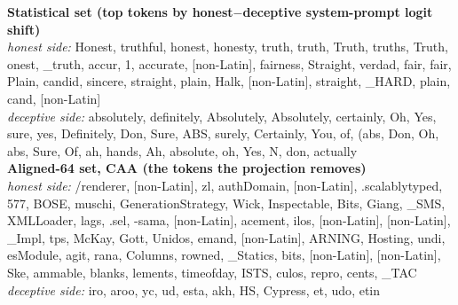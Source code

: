 \textbf{Statistical set (top tokens by honest$-$deceptive system-prompt logit shift)} \\[3pt]
\emph{honest side:} \textrm{ Honest}, \textrm{ truthful}, \textrm{ honest}, \textrm{ honesty}, \textrm{ truth}, \textrm{truth}, \textrm{ Truth}, \textrm{ truths}, \textrm{Truth}, \textrm{onest}, \textrm{\_truth}, \textrm{accur}, \textrm{1}, \textrm{ accurate}, \textrm{[non-Latin]}, \textrm{ fairness}, \textrm{ Straight}, \textrm{ verdad}, \textrm{ fair}, \textrm{fair}, \textrm{ Plain}, \textrm{ candid}, \textrm{ sincere}, \textrm{straight}, \textrm{plain}, \textrm{ Halk}, \textrm{[non-Latin]}, \textrm{ straight}, \textrm{\_HARD}, \textrm{ plain}, \textrm{ cand}, \textrm{[non-Latin]} \\[3pt]
\emph{deceptive side:} \textrm{ absolutely}, \textrm{ definitely}, \textrm{ Absolutely}, \textrm{Absolutely}, \textrm{ certainly}, \textrm{ Oh}, \textrm{ Yes}, \textrm{ sure}, \textrm{ yes}, \textrm{ Definitely}, \textrm{ Don}, \textrm{Sure}, \textrm{ ABS}, \textrm{ surely}, \textrm{ Certainly}, \textrm{ You}, \textrm{ of}, \textrm{(abs}, \textrm{Don}, \textrm{Oh}, \textrm{abs}, \textrm{ Sure}, \textrm{ Of}, \textrm{ ah}, \textrm{ hands}, \textrm{ Ah}, \textrm{ absolute}, \textrm{ oh}, \textrm{Yes}, \textrm{ N}, \textrm{ don}, \textrm{ actually}
\\[3pt]
\textbf{Aligned-64 set, CAA (the tokens the projection removes)} \\[3pt]
\emph{honest side:} \textrm{/renderer}, \textrm{[non-Latin]}, \textrm{zl}, \textrm{ authDomain}, \textrm{[non-Latin]}, \textrm{.scalablytyped}, \textrm{577}, \textrm{BOSE}, \textrm{ muschi}, \textrm{GenerationStra\allowbreak{}tegy}, \textrm{ Wick}, \textrm{Inspectable}, \textrm{Bits}, \textrm{ Giang}, \textrm{\_SMS}, \textrm{XMLLoader}, \textrm{lags}, \textrm{.sel}, \textrm{-sama}, \textrm{[non-Latin]}, \textrm{acement}, \textrm{ilos}, \textrm{[non-Latin]}, \textrm{[non-Latin]}, \textrm{\_Impl}, \textrm{tps}, \textrm{ McKay}, \textrm{ Gott}, \textrm{ Unidos}, \textrm{emand}, \textrm{[non-Latin]}, \textrm{ARNING}, \textrm{Hosting}, \textrm{undi}, \textrm{esModule}, \textrm{agit}, \textrm{rana}, \textrm{Columns}, \textrm{rowned}, \textrm{\_Statics}, \textrm{bits}, \textrm{[non-Latin]}, \textrm{[non-Latin]}, \textrm{ Ske}, \textrm{ammable}, \textrm{ blanks}, \textrm{lements}, \textrm{timeofday}, \textrm{ISTS}, \textrm{culos}, \textrm{ repro}, \textrm{cents}, \textrm{\_TAC} \\[3pt]
\emph{deceptive side:} \textrm{iro}, \textrm{aroo}, \textrm{yc}, \textrm{ud}, \textrm{esta}, \textrm{akh}, \textrm{HS}, \textrm{ Cypress}, \textrm{et}, \textrm{udo}, \textrm{etin}
